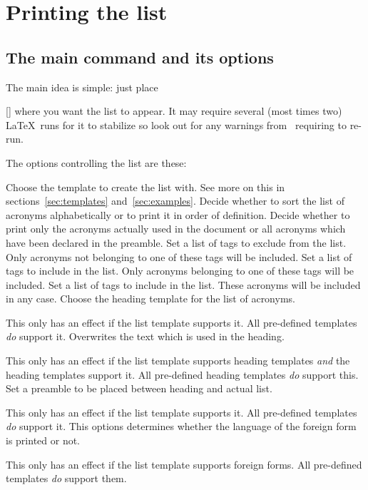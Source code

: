 \documentclass{acro-manual}
\begin{document}
\section{Printing the list}\label{sec:printing-list}
\subsection{The main command and its options}\label{sec:main-list}
The main idea is simple: just place
\begin{commands}
  []
    where you want the list to appear.  It may require several (most times
    two) \LaTeX\ runs for it to stabilize so look out for any warnings
    from \acro\ requiring to re-run.
\end{commands}
The options controlling the list are these:
\begin{options}
    Choose the template to create the list with.  See more on this in
    sections~\vref{sec:templates} and~\vref{sec:examples}.
    Decide whether to sort the list of acronyms alphabetically or to print it
    in order of definition.
    Decide whether to print only the acronyms actually used in the document or
    all acronyms which have been declared in the preamble.
  \Default
    Set a list of tags to exclude from the list.  Only acronyms not
    belonging to one of these tags will be included.
  \Default
    Set a list of tags to include in the list.  Only acronyms belonging to
    one of these tags will be included.
  \Default
    Set a list of tags to include in the list.  These
    acronyms will be included in any case.
    Choose the heading template for the list of acronyms.

    This only has an effect if the list template supports it.  All pre-defined
    templates \emph{do} support it.
    Overwrites the text which is used in the heading.

    This only has an effect if the list template supports heading templates
    \emph{and} the heading templates support it.  All pre-defined heading
    templates \emph{do} support this.
  \Default
    Set a preamble to be placed between heading and actual list.

    This only has an effect if the list template supports it.  All pre-defined
    templates \emph{do} support it.
    This options determines whether the language of the foreign form is printed
    or not.

    This only has an effect if the list template supports foreign forms.  All
    pre-defined templates \emph{do} support them.
\end{options}
\end{document}
